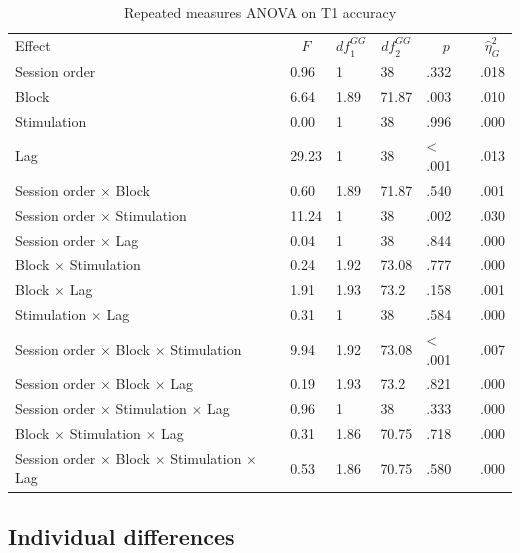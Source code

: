 \documentclass[11pt,english,]{memoir}
\makeatletter
\newcommand\LastLTentrywidth{1em}
\newlength\longtablewidth
\newcommand{\getlongtablewidth}{\begingroup \ifcsname LT@\roman{LT@tables}\endcsname \global\longtablewidth=0pt \renewcommand{\LT@entry}[2]{\global\advance\longtablewidth by ##2\relax\gdef\LastLTentrywidth{##2}}\@nameuse{LT@\roman{LT@tables}} \fi \endgroup}
\makeatother
\begin{document}
\begin{center}
\begin{ThreePartTable}
\small{
\begin{longtable}{llllll}\noalign{\getlongtablewidth\global\LTcapwidth=\longtablewidth}
\caption{\label{tab:tab-anova-T1}Repeated measures ANOVA on T1 accuracy}\\
\toprule
Effect & \multicolumn{1}{c}{$F$} & \multicolumn{1}{c}{$\mathit{df}_1^{GG}$} & \multicolumn{1}{c}{$\mathit{df}_2^{GG}$} & \multicolumn{1}{c}{$p$} & \multicolumn{1}{c}{$\hat{\eta}^2_G$}\\
\midrule
Session order & 0.96 & 1 & 38 & .332 & .018\\
Block & 6.64 & 1.89 & 71.87 & .003 & .010\\
Stimulation & 0.00 & 1 & 38 & .996 & .000\\
Lag & 29.23 & 1 & 38 & < .001 & .013\\
Session order $\times$ Block & 0.60 & 1.89 & 71.87 & .540 & .001\\
Session order $\times$ Stimulation & 11.24 & 1 & 38 & .002 & .030\\
Session order $\times$ Lag & 0.04 & 1 & 38 & .844 & .000\\
Block $\times$ Stimulation & 0.24 & 1.92 & 73.08 & .777 & .000\\
Block $\times$ Lag & 1.91 & 1.93 & 73.2 & .158 & .001\\
Stimulation $\times$ Lag & 0.31 & 1 & 38 & .584 & .000\\
Session order $\times$ Block $\times$ Stimulation & 9.94 & 1.92 & 73.08 & < .001 & .007\\
Session order $\times$ Block $\times$ Lag & 0.19 & 1.93 & 73.2 & .821 & .000\\
Session order $\times$ Stimulation $\times$ Lag & 0.96 & 1 & 38 & .333 & .000\\
Block $\times$ Stimulation $\times$ Lag & 0.31 & 1.86 & 70.75 & .718 & .000\\
Session order $\times$ Block $\times$ Stimulation $\times$ Lag & 0.53 & 1.86 & 70.75 & .580 & .000\\
\bottomrule
\end{longtable}
}
\end{ThreePartTable}
\end{center}

\endgroup

\hypertarget{individual-differences}{%
\subsection{Individual differences}\label{individual-differences}}
\end{document}

